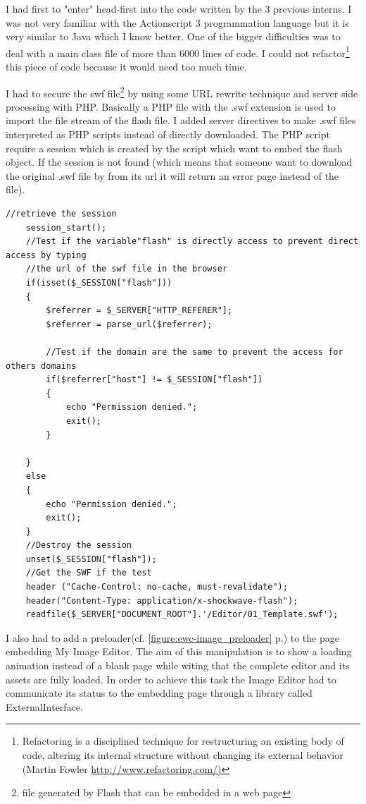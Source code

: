 I had first to "enter" head-first into the code written by the 3 previous interns. I was not very familiar with the Actionscript 3 programmation language but it is very similar to Java which I know better. One of the bigger difficulties was to deal with a main class file of more than 6000 lines of code. I could not refactor\footnote{Refactoring is a disciplined technique for restructuring an existing body of code, altering its internal structure without changing its external behavior (Martin Fowler \url{http://www.refactoring.com/)}} this piece of code because it would need too much time. 

I had to secure the swf file\footnote{file generated by Flash that can be embedded in a web page} by  using some URL rewrite technique and server side processing with PHP. Basically a PHP file with the .swf extension is used to import the file stream of the flash file. I added server directives to make .swf files interpreted as PHP scripts instead of directly downloaded. The PHP script require a session which is created by the script which want to embed the flash object. If the session is not found (which means that someone want to download the original .swf file by from its url it will return an error page instead of the file).

\lstset{language=PHP}
\begin{lstlisting}[label=swf-secure,caption=PHP script disguised into a swf file to avoid direct download]
	//retrieve the session
	session_start();
	//Test if the variable"flash" is directly access to prevent direct access by typing
	//the url of the swf file in the browser
	if(isset($_SESSION["flash"]))
	{
		$referrer = $_SERVER["HTTP_REFERER"];
		$referrer = parse_url($referrer);

		//Test if the domain are the same to prevent the access for others domains
		if($referrer["host"] != $_SESSION["flash"])
		{
			echo "Permission denied.";
			exit();
		}

	}
	else
	{
		echo "Permission denied.";
		exit();
	}
	//Destroy the session
	unset($_SESSION["flash"]);
	//Get the SWF if the test	
	header ("Cache-Control: no-cache, must-revalidate");
	header("Content-Type: application/x-shockwave-flash");
	readfile($_SERVER["DOCUMENT_ROOT"].'/Editor/01_Template.swf');
\end{lstlisting}


I also had to add a preloader(cf. \ref{figure:ewc-image_preloader} p.\pageref{figure:ewc-image_preloader}) to the page embedding My Image Editor. The aim of this manipulation is to show a loading animation instead of a blank page while witing that the complete editor and its assets are fully loaded. In order to achieve this task the Image Editor had to communicate its status to the embedding page through a library called ExternalInterface. 

